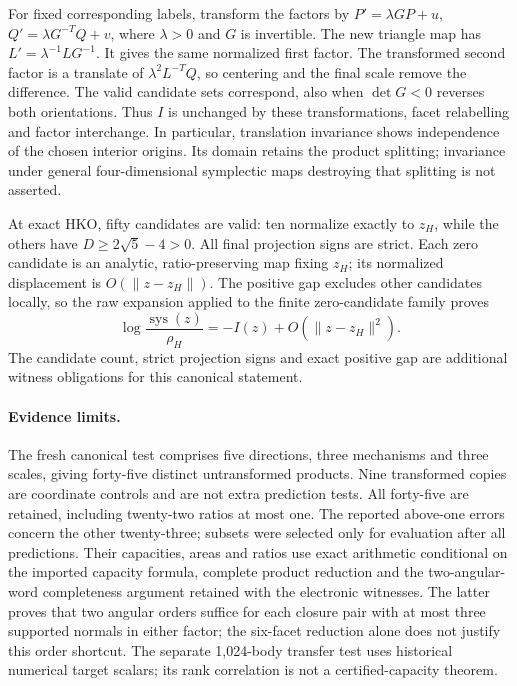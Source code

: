 For fixed corresponding labels, transform the factors by
$P'=\lambda GP+u$, $Q'=\lambda G^{-T}Q+v$,
where $\lambda>0$ and $G$ is invertible.
The new triangle map has $L'=\lambda^{-1}LG^{-1}$.
It gives the same normalized first factor. The transformed second factor
is a translate of $\lambda^2L^{-T}Q$, so centering and the final scale
remove the difference. The valid candidate sets correspond, also when
$\det G<0$ reverses both orientations. Thus $I$ is unchanged by these
transformations, facet relabelling and factor interchange. In particular,
translation invariance shows independence of the chosen interior origins. Its domain
retains the product splitting; invariance under general four-dimensional
symplectic maps destroying that splitting is not asserted.

At exact HKO, fifty candidates are valid: ten normalize exactly to $z_H$,
while the others have $D\geq2\sqrt5-4>0$. All final projection signs are
strict. Each zero candidate is an analytic, ratio-preserving map fixing
$z_H$; its normalized displacement is $O(\|z-z_H\|)$.
The positive gap excludes other candidates locally, so the raw expansion
applied to the finite zero-candidate family proves
\[
 \log\frac{\operatorname{sys}(z)}{\rho_H}
             =-I(z)+O(\|z-z_H\|^2).
\]
The candidate count, strict projection signs and exact positive gap are
additional witness obligations for this canonical statement.

\paragraph{Evidence limits.}
The fresh canonical test comprises five directions, three mechanisms and
three scales, giving forty-five distinct untransformed products. Nine
transformed copies are coordinate controls and are not extra prediction
tests. All forty-five are retained, including twenty-two ratios at most
one. The reported above-one errors concern the other twenty-three;
subsets were selected only for evaluation after all predictions.
Their capacities, areas and ratios use exact arithmetic conditional on
the imported capacity formula, complete product reduction and the
two-angular-word completeness argument retained with the electronic
witnesses. The latter proves that two angular orders suffice for each
closure pair with at most three supported normals in either factor;
the six-facet reduction alone does not justify this order shortcut.
The separate 1,024-body transfer test uses historical numerical target
scalars; its rank correlation is not a certified-capacity theorem.

